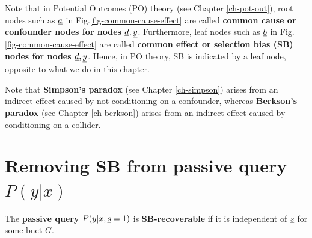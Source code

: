 Note
that in Potential
Outcomes (PO) theory
 (see Chapter \ref{ch-pot-out}),
root nodes such
as ${\underline{a}}$ in
Fig.\ref{fig-common-cause-effect}
are called {\bf common cause
 or confounder nodes
for nodes ${\underline{d}}, {\underline{y}}$}.
Furthermore, leaf nodes such as 
${\underline{b}}$ in
Fig.\ref{fig-common-cause-effect} are 
called 
{\bf common effect
or selection bias (SB) nodes
for nodes ${\underline{d}}, {\underline{y}}$}.
Hence, in PO theory,
SB is indicated
by
a leaf node,
opposite to 
what we do in this chapter.

Note that 
{\bf Simpson's paradox} (see Chapter
\ref{ch-simpson}) arises from an indirect effect
caused by \ul{not conditioning} 
on a confounder,
whereas 
{\bf Berkson's paradox}
(see Chapter \ref{ch-berkson})
arises from an indirect effect
caused by \ul{conditioning}
on a collider.



\section{Removing SB from 
passive query $P(y|x)$}

The {\bf  passive query} $P(y|x, {\underline{s}}=1)$
is {\bf SB-recoverable}
if it is independent of ${\underline{s}}$
for some bnet $G$.







